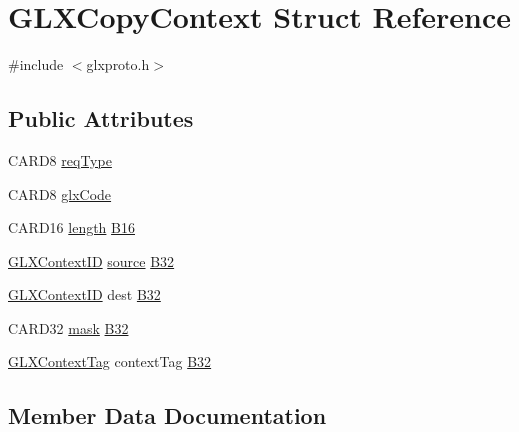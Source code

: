 \hypertarget{struct_g_l_x_copy_context}{}\section{G\+L\+X\+Copy\+Context Struct Reference}
\label{struct_g_l_x_copy_context}


{\ttfamily \#include $<$glxproto.\+h$>$}

\subsection*{Public Attributes}
\begin{DoxyCompactItemize}
\item 
C\+A\+R\+D8 \hyperlink{struct_g_l_x_copy_context_af84cc58bab8544760e909bafab049fd4}{req\+Type}
\item 
C\+A\+R\+D8 \hyperlink{struct_g_l_x_copy_context_a1779c1c81788e7e0e092e6e3911e7872}{glx\+Code}
\item 
C\+A\+R\+D16 \hyperlink{glcorearb_8h_ab9c919755bde3b34349e23a32b4e0fa7}{length} \hyperlink{struct_g_l_x_copy_context_af553a0d066bafeec569268eb01e1c139}{B16}
\item 
\hyperlink{glx_8h_a17c7ca5b76cc448032df0b5352803005}{G\+L\+X\+Context\+ID} \hyperlink{glcorearb_8h_a633906574fe6e39b7f2840bed0e49832}{source} \hyperlink{struct_g_l_x_copy_context_abf62334255d39f0d1cf080f0bf06ad39}{B32}
\item 
\hyperlink{glx_8h_a17c7ca5b76cc448032df0b5352803005}{G\+L\+X\+Context\+ID} dest \hyperlink{struct_g_l_x_copy_context_a8cffcb03f29cf3939019dc822c2f2950}{B32}
\item 
C\+A\+R\+D32 \hyperlink{glcorearb_8h_a2e8825c19147a8250013df8e4275f5b6}{mask} \hyperlink{struct_g_l_x_copy_context_a0a210ec5717ca3b5616d287932dcd3a9}{B32}
\item 
\hyperlink{glxproto_8h_ae71763ce00c9fa460beb4699af678691}{G\+L\+X\+Context\+Tag} context\+Tag \hyperlink{struct_g_l_x_copy_context_afbe45a302e85f234461a5b051f8f34fd}{B32}
\end{DoxyCompactItemize}


\subsection{Member Data Documentation}
\mbox{\label{struct_g_l_x_copy_context_af553a0d066bafeec569268eb01e1c139}} 
